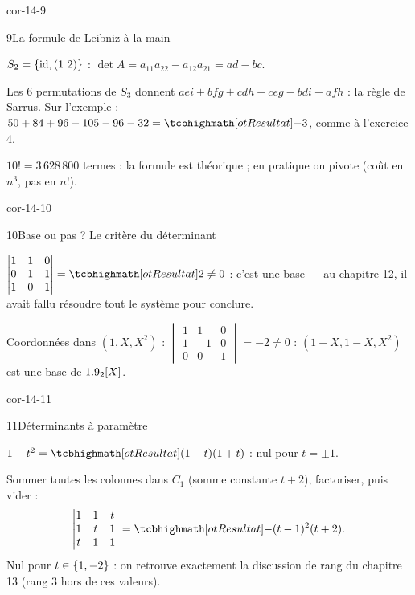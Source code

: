 \begin{blocLivre}{cor-14-9}
\begin{corrige}{9}{La formule de Leibniz à la main}
\begin{questions}
  \item $S_2=\left\{\mathrm{id},(1\ 2)\right\}$ :
    $\det A=a_{11}a_{22}-a_{12}a_{21}=ad-bc$.
  \item Les $6$ permutations de $S_3$ donnent
    $aei+bfg+cdh-ceg-bdi-afh$ : la règle de Sarrus. Sur l'exemple :
    $50+84+96-105-96-32=\res{-3}$, comme à l'exercice 4.
  \item $10!=3\,628\,800$ termes : la formule est théorique ; en pratique
    on pivote (coût en $n^{3}$, pas en $n!$).
\end{questions}
\end{corrige}
\end{blocLivre}

\begin{blocLivre}{cor-14-10}
\begin{corrige}{10}{Base ou pas ? Le critère du déterminant}
\begin{questions}
  \item $\begin{vmatrix}1&1&0\\0&1&1\\1&0&1\end{vmatrix}=\res{2}\neq0$ :
    c'est une base — au chapitre 12, il avait fallu résoudre tout le
    système pour conclure.
  \item Coordonnées dans $(1,X,X^{2})$ :
    $\begin{vmatrix}1&1&0\\1&-1&0\\0&0&1\end{vmatrix}=-2\neq0$ :
    $(1+X,1-X,X^{2})$ est une base de $1.9_2[X]$.
\end{questions}
\end{corrige}
\end{blocLivre}

\begin{blocLivre}{cor-14-11}
\begin{corrige}{11}{Déterminants à paramètre}
\begin{questions}
  \item $1-t^{2}=\res{(1-t)(1+t)}$ : nul pour $t=\pm1$.
  \item Sommer toutes les colonnes dans $C_1$ (somme constante $t+2$),
    factoriser, puis vider :
    \[
    \begin{vmatrix}1&1&t\\1&t&1\\t&1&1\end{vmatrix}
    =\res{-(t-1)^{2}(t+2)}.
    \]
    Nul pour $t\in\left\{1,-2\right\}$ : on retrouve exactement la discussion de
    rang du chapitre 13 (rang $3$ hors de ces valeurs).
\end{questions}
\end{corrige}
\end{blocLivre}

